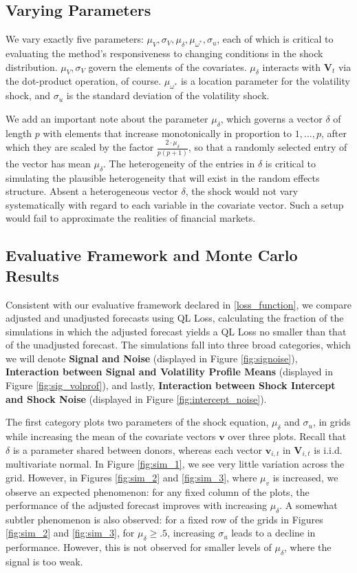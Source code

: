 \documentclass[11pt,3p,review,authoryear]{elsarticle}
\newcommand{\x}{\textbf{v}}
\newcommand{\V}{\textbf{V}}
\theoremstyle{definition}
\begin{document}
  \subsection{Varying Parameters}
  We vary exactly five parameters: $\mu_{V}, \sigma_{V}, \mu_{\delta}, \mu_{\omega^{*}}, \sigma_{u}$, each of which is critical to evaluating the method's responsiveness to changing conditions in the shock distribution. $\mu_{V}, \sigma_{V}$ govern the elements of the covariates. $\mu_{\delta}$ interacts with $\textbf{V}_{t}$ via the dot-product operation, of course.  $\mu_{\omega^{*}}$ is a location parameter for the volatility shock, and $\sigma_{u}$ is the standard deviation of the volatility shock.
  
  We add an important note about the parameter $\mu_{\delta}$, which governs a vector $\delta$ of length $p$ with elements that increase monotonically in proportion to $1,...,p$, after which they are scaled by the factor $\frac{2\cdot\mu_{\delta}}{p(p+1)}$, so that a randomly selected entry of the vector has mean $\mu_{\delta}$.  The heterogeneity of the entries in $\delta$ is critical to simulating the plausible heterogeneity that will exist in the random effects structure.  Absent a heterogeneous vector $\delta$, the shock would not vary systematically with regard to each variable in the covariate vector.  Such a setup would fail to approximate the realities of financial markets.

\subsection{Evaluative Framework and Monte Carlo Results}
Consistent with our evaluative framework declared in \ref{loss_function}, we compare adjusted and unadjusted forecasts using QL Loss, calculating the fraction of the simulations in which the adjusted forecast yields a QL Loss no smaller than that of the unadjusted forecast.  The simulations fall into three broad categories, which we will denote \textbf{Signal and Noise} (displayed in Figure \ref{fig:signoise}), \textbf{Interaction between Signal and Volatility Profile Means} (displayed in Figure \ref{fig:sig_volprof}), and lastly, \textbf{Interaction between Shock Intercept and Shock Noise} (displayed in Figure \ref{fig:intercept_noise}).  

The first category plots two parameters of the shock equation, $\mu_{\delta}$ and $\sigma_{u}$, in grids while increasing the mean of the covariate vectors $\x$ over three plots.  Recall that $\delta$ is a parameter shared between donors, whereas each vector $\x_{i,t}$ in $\V_{i,t}$ is i.i.d. multivariate normal.  In Figure \ref{fig:sim_1}, we see very little variation across the grid.  However, in Figures \ref{fig:sim_2} and \ref{fig:sim_3}, where $\mu_{v}$ is increased, we observe an expected phenomenon: for any fixed column of the plots, the performance of the adjusted forecast improves with increasing $\mu_{\delta}$.  A somewhat subtler phenomenon is also observed: for a fixed row of the grids in Figures \ref{fig:sim_2} and \ref{fig:sim_3}, for $\mu_{\delta} \geq .5$, increasing $\sigma_{u}$ leads to a decline in performance.  However, this is not observed for smaller levels of $\mu_{\delta}$, where the signal is too weak.
\end{document}
